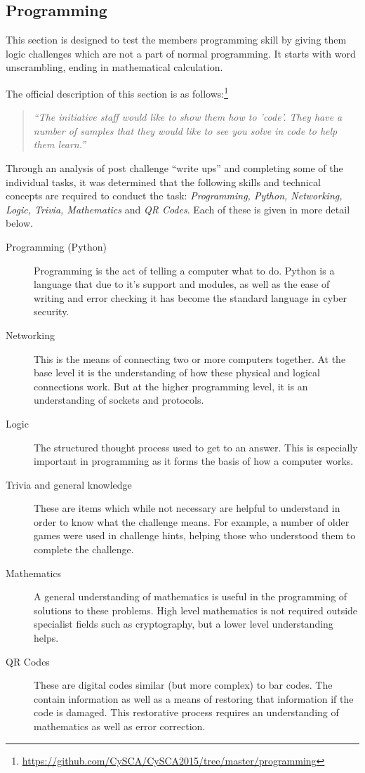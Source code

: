 \documentclass[a4paper,11pt]{report}
\begin{document}
		\subsection{Programming}
			This section is designed to test the members programming skill by giving them logic challenges which are not a part of normal programming. 
			It starts with word unscrambling, ending in mathematical calculation. 
			
			The official description of this section is as follows:\footnote{\url{https://github.com/CySCA/CySCA2015/tree/master/programming}}
			\begin{quote}
				\textit{``The initiative staff would like to show them how to 'code'. They have a number of samples that they would like to see you solve in code to help them learn.''}
			\end{quote}

			Through an analysis of post challenge ``write ups'' and completing some of the individual tasks, 
			it was determined that the following skills and technical concepts are required to conduct the task: 
			\textit{Programming, Python, Networking, Logic, Trivia, Mathematics} and \textit{QR Codes}.
			Each of these is given in more detail below. 
			\begin{description}
				\item[Programming (Python)]
					Programming is the act of telling a computer what to do. 
					Python is a language that due to it's support and modules, as well as the ease of writing and error checking it has become the standard language in cyber security. 
				\item[Networking]
					This is the means of connecting two or more computers together. 
					At the base level it is the understanding of how these physical and logical connections work. 
					But at the higher programming level, it is an understanding of sockets and protocols. 
				\item[Logic]
					The structured thought process used to get to an answer. 
					This is especially important in programming as it forms the basis of how a computer works. 
				\item[Trivia and general knowledge] 
					These are items which while not necessary are helpful to understand in order to know what the challenge means. 
					For example, a number of older games were used in challenge hints, helping those who understood them to complete the challenge. 
				\item[Mathematics] 
					A general understanding of mathematics is useful in the programming of solutions to these problems. 
					High level mathematics is not required outside specialist fields such as cryptography, but a lower level understanding helps. 
				\item[QR Codes]
					These are digital codes similar (but more complex) to bar codes.
					The contain information as well as a means of restoring that information if the code is damaged. 
					This restorative process requires an understanding of mathematics as well as error correction. 
			\end{description}
\end{document}
